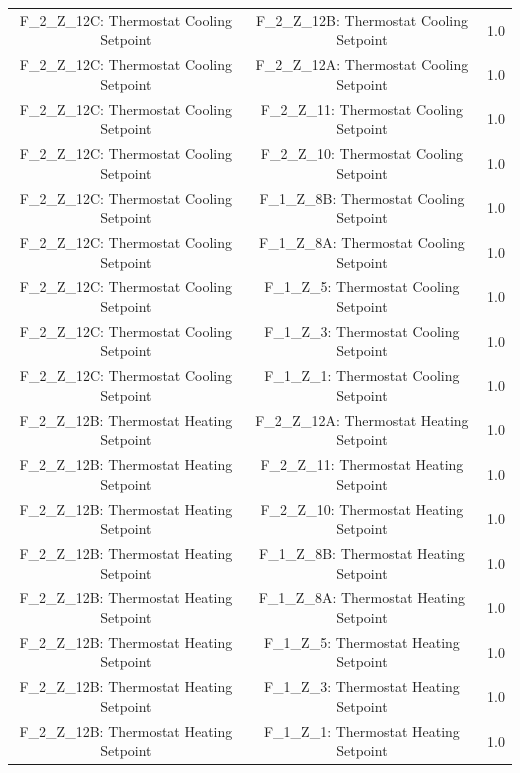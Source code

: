 \documentclass[aps, 10pt, a4paper]{article}
\begin{document}
\begin{longtable}{c|c||c}
                    F\_2\_Z\_12C: Thermostat Cooling Setpoint & F\_2\_Z\_12B: Thermostat Cooling Setpoint & 1.0 \\
                    F\_2\_Z\_12C: Thermostat Cooling Setpoint & F\_2\_Z\_12A: Thermostat Cooling Setpoint & 1.0 \\
                    F\_2\_Z\_12C: Thermostat Cooling Setpoint & F\_2\_Z\_11: Thermostat Cooling Setpoint & 1.0 \\
                    F\_2\_Z\_12C: Thermostat Cooling Setpoint & F\_2\_Z\_10: Thermostat Cooling Setpoint & 1.0 \\
                    F\_2\_Z\_12C: Thermostat Cooling Setpoint & F\_1\_Z\_8B: Thermostat Cooling Setpoint & 1.0 \\
                    F\_2\_Z\_12C: Thermostat Cooling Setpoint & F\_1\_Z\_8A: Thermostat Cooling Setpoint & 1.0 \\
                    F\_2\_Z\_12C: Thermostat Cooling Setpoint & F\_1\_Z\_5: Thermostat Cooling Setpoint & 1.0 \\
                    F\_2\_Z\_12C: Thermostat Cooling Setpoint & F\_1\_Z\_3: Thermostat Cooling Setpoint & 1.0 \\
                    F\_2\_Z\_12C: Thermostat Cooling Setpoint & F\_1\_Z\_1: Thermostat Cooling Setpoint & 1.0 \\
                    F\_2\_Z\_12B: Thermostat Heating Setpoint & F\_2\_Z\_12A: Thermostat Heating Setpoint & 1.0 \\
                    F\_2\_Z\_12B: Thermostat Heating Setpoint & F\_2\_Z\_11: Thermostat Heating Setpoint & 1.0 \\
                    F\_2\_Z\_12B: Thermostat Heating Setpoint & F\_2\_Z\_10: Thermostat Heating Setpoint & 1.0 \\
                    F\_2\_Z\_12B: Thermostat Heating Setpoint & F\_1\_Z\_8B: Thermostat Heating Setpoint & 1.0 \\
                    F\_2\_Z\_12B: Thermostat Heating Setpoint & F\_1\_Z\_8A: Thermostat Heating Setpoint & 1.0 \\
                    F\_2\_Z\_12B: Thermostat Heating Setpoint & F\_1\_Z\_5: Thermostat Heating Setpoint & 1.0 \\
                    F\_2\_Z\_12B: Thermostat Heating Setpoint & F\_1\_Z\_3: Thermostat Heating Setpoint & 1.0 \\
                    F\_2\_Z\_12B: Thermostat Heating Setpoint & F\_1\_Z\_1: Thermostat Heating Setpoint & 1.0 \\

\end{longtable}
\end{document}

